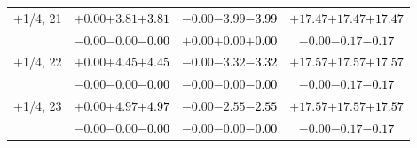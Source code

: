 \documentclass[compress]{beamer}
\begin{document}
\begin{frame}
\begin{tabular}{r | c | c | c}
$+$1/4, 21 & $+0.00$\hspace{0.1 cm}$+3.81$\hspace{0.1 cm}\textcolor{black}{$+3.81$} & $-0.00$\hspace{0.1 cm}$-3.99$\hspace{0.1 cm}\textcolor{black}{$-3.99$} & $+17.47$\hspace{0.1 cm}$+17.47$\hspace{0.1 cm}\textcolor{black}{$+17.47$} \\
           & $-0.00$\hspace{0.1 cm}$-0.00$\hspace{0.1 cm}\textcolor{black}{$-0.00$} & $+0.00$\hspace{0.1 cm}$+0.00$\hspace{0.1 cm}\textcolor{black}{$+0.00$} & $-0.00$\hspace{0.1 cm}$-0.17$\hspace{0.1 cm}\textcolor{black}{$-0.17$} \\
$+$1/4, 22 & $+0.00$\hspace{0.1 cm}$+4.45$\hspace{0.1 cm}\textcolor{black}{$+4.45$} & $-0.00$\hspace{0.1 cm}$-3.32$\hspace{0.1 cm}\textcolor{black}{$-3.32$} & $+17.57$\hspace{0.1 cm}$+17.57$\hspace{0.1 cm}\textcolor{black}{$+17.57$} \\
           & $-0.00$\hspace{0.1 cm}$-0.00$\hspace{0.1 cm}\textcolor{black}{$-0.00$} & $-0.00$\hspace{0.1 cm}$-0.00$\hspace{0.1 cm}\textcolor{black}{$-0.00$} & $-0.00$\hspace{0.1 cm}$-0.17$\hspace{0.1 cm}\textcolor{black}{$-0.17$} \\
$+$1/4, 23 & $+0.00$\hspace{0.1 cm}$+4.97$\hspace{0.1 cm}\textcolor{black}{$+4.97$} & $-0.00$\hspace{0.1 cm}$-2.55$\hspace{0.1 cm}\textcolor{black}{$-2.55$} & $+17.57$\hspace{0.1 cm}$+17.57$\hspace{0.1 cm}\textcolor{black}{$+17.57$} \\
           & $-0.00$\hspace{0.1 cm}$-0.00$\hspace{0.1 cm}\textcolor{black}{$-0.00$} & $-0.00$\hspace{0.1 cm}$-0.00$\hspace{0.1 cm}\textcolor{black}{$-0.00$} & $-0.00$\hspace{0.1 cm}$-0.17$\hspace{0.1 cm}\textcolor{black}{$-0.17$} \\

\end{tabular}
\end{frame}
\end{document}
